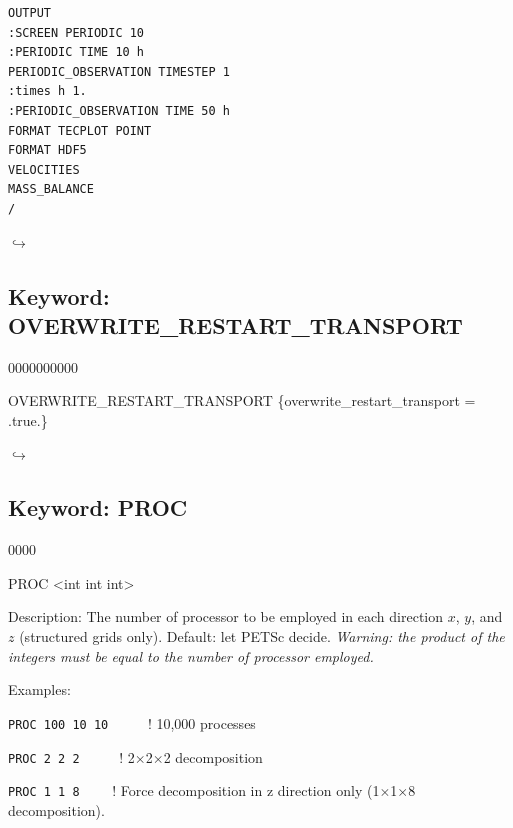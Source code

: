 \documentclass[12pt]{article}
\newcommand\return{{\hfill$\hookrightarrow$}}
\begin{document}

\begin{verbatim}
OUTPUT
:SCREEN PERIODIC 10
:PERIODIC TIME 10 h
PERIODIC_OBSERVATION TIMESTEP 1
:times h 1.
:PERIODIC_OBSERVATION TIME 50 h
FORMAT TECPLOT POINT
FORMAT HDF5
VELOCITIES
MASS_BALANCE
/
\end{verbatim}

\hyperlink{target_key}{\return}


\newpage
\protect\hypertarget{target_overwrite}{}

\subsection{Keyword: OVERWRITE\_RESTART\_TRANSPORT}
\begin{deflist}{0000000000}
\item[OVERWRITE\_RESTART\_TRANSPORT] \{overwrite\_restart\_transport = .true.\}
\end{deflist}

\hyperlink{target_key}{\return}


\newpage
\protect\hypertarget{target_proc}{}

\subsection{Keyword: PROC}

\begin{deflist}{0000}
\item[PROC] <int int int> 
\item[Description:] The number of processor to be employed in each direction $x$, $y$, and $z$ (structured grids only). Default: let PETSc decide. {\em Warning: the product of the integers must be equal to the number of processor employed.}
\item[Examples:] ~

{\tt PROC 100 10 10} \ \ \ \ \ ! 10,000 processes

{\tt PROC 2 2 2} \ \ \ \ \ ! 2$\times$2$\times$2 decomposition

{\tt PROC 1 1 8} \ \ \ \ ! Force decomposition in z direction only (1$\times$1$\times$8 decomposition).
\end{deflist}
\end{document}
